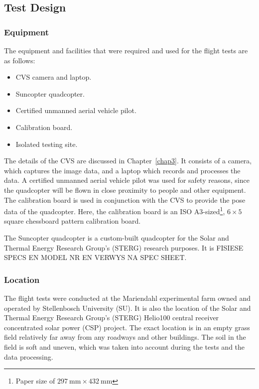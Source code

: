 \subsection{Test Design}

\subsubsection{Equipment}

The equipment and facilities that were required and used for the flight tests are as follows:

\begin{itemize}
    \item CVS camera and laptop.
    \item Suncopter quadcopter.
    \item Certified unmanned aerial vehicle pilot.
    \item Calibration board.
    \item Isolated testing site. 
\end{itemize}

The details of the CVS are discussed in Chapter~\ref{chap3}. It consists of a camera, which captures the image data, and a laptop which records and processes the data. A certified unmanned aerial vehicle pilot was used for safety reasons, since the quadcopter will be flown in close proximity to people and other equipment. The calibration board is used in conjunction with the CVS to provide the pose data of the quadcopter. Here, the calibration board is an ISO A3-sized\footnote{Paper size of $\SI{297}{\mm}\times\SI{432}{\mm}$}, $6\times5$ square chessboard pattern calibration board. 

The Suncopter quadcopter is a custom-built quadcopter for the Solar and Thermal Energy Research Group's (STERG) research purposes. It is FISIESE SPECS EN MODEL NR EN VERWYS NA SPEC SHEET\@.

\subsubsection{Location}

The flight tests were conducted at the Mariendahl experimental farm owned and operated by Stellenbosch University (SU). It is also the location of the Solar and Thermal Energy Research Group's (STERG) Helio100 central receiver concentrated solar power (CSP) project. The exact location is in an empty grass field relatively far away from any roadways and other buildings. The soil in the field is soft and uneven, which was taken into account during the tests and the data processing. 

